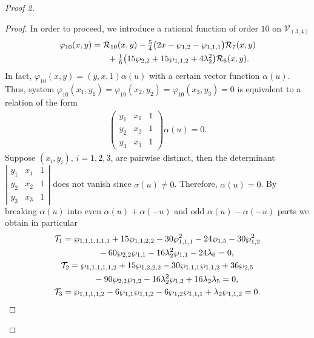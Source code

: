 \begin{proof}[Proof 2]
\begin{proof}
In order to proceed, we introduce a rational function of order $10$ {on $\mathcal{V}_{(3,4)}$}
\begin{gather*}
 \varphi_{10}(x,y) = \mathcal{R}_{10}(x,y) -
 \tfrac{5}{4} \bigl(2x - \wp_{1,2} - \wp_{1,1,1}\bigr) \mathcal{R}_{7}(x,y)\\
 \hphantom{\varphi_{10}(x,y) =}{} + \tfrac{1}{6}\bigl(15 \wp_{2,2} + 15\wp_{1,1,2} + 4\lambda_2^2\bigr) \mathcal{R}_{6}(x,y).
\end{gather*}
In fact, $\varphi_{10}(x,y)=(y,x,1)\alpha(u)$ with a certain vector function $\alpha(u)$. Thus, system $\varphi_{10}(x_1,y_1)= \varphi_{10}(x_2,y_2)= \varphi_{10}(x_3,y_3)=0$ is equivalent to a relation of the form
\begin{gather*}
 \begin{pmatrix}
 y_1 & x_1 & 1 \\ y_2 & x_2 & 1\\ y_3 & x_3 & 1
 \end{pmatrix} \alpha (u) = 0.
\end{gather*}
Suppose $(x_i,y_i)$, $i=1,2,3$, are pairwise distinct, then the determinant $\left|\begin{smallmatrix} y_1 & x_1 & 1 \\ y_2 & x_2 & 1\\ y_3 & x_3 & 1 \end{smallmatrix}\right|$ does not vanish since $\sigma(u)\neq 0$. Therefore, $\alpha(u)=0$. By breaking $\alpha (u)$ into even $\alpha (u) + \alpha (-u)$ and odd $\alpha (u) - \alpha (-u)$ parts we obtain in particular
\begin{subequations}
\begin{gather}
 \mathcal{T}_1 = \wp_{1,1,1,1,1,1} + 15\wp_{1,1,2,2} - 30\wp_{1,1,1}^2 - 24\wp_{1,5} -30 \wp_{1,2}^2\nonumber\\
 \hphantom{\mathcal{T}_1 =}{} - 60\wp_{2,2}\wp_{1,1} - 16\lambda_2^2 \wp_{1,1} - 24 \lambda_6 = 0, \label{EvenRel1C34}\\
 \mathcal{T}_2 = \wp_{1,1,1,1,1,2} + 15\wp_{1,2,2,2} - 30\wp_{1,1,1}\wp_{1,1,2} + 36\wp_{2,5}\nonumber\\
 \hphantom{\mathcal{T}_2 =}{} - 90 \wp_{2,2}\wp_{1,2} - 16\lambda_2^2 \wp_{1,2} + 16 \lambda_2 \lambda_5 = 0 , \label{EvenRel2C34}\\
 \mathcal{T}_3 = \wp_{1,1,1,1,2} - 6\wp_{1,1}\wp_{1,1,2} - 6\wp_{1,2}\wp_{1,1,1} + \lambda_2 \wp_{1,1,2} = 0. \label{OddRelC34}
\end{gather}
\end{subequations}


\end{proof}
\end{proof}
